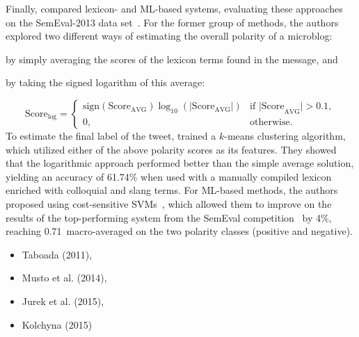 Finally, \citet{Kolchyna:15} compared lexicon- and ML-based systems,
evaluating these approaches on the SemEval-2013 data
set~\cite{Nakov:13}.  For the former group of methods, the authors
explored two different ways of estimating the overall polarity of a
microblog:
\begin{inparaenum}[(i)]
\item by simply averaging the scores of the lexicon terms found in the
  message, and
\item by taking the signed logarithm of this average:
\end{inparaenum}
\begin{equation*}
  \text{Score}_{\log} =
  \begin{cases}
    \text{sign}(\text{Score}_{\text{AVG}})\log_{10}(|\text{Score}_{\text{AVG}}|) & %
    \text{if |Score}_{\text{AVG}}| > 0.1,\\
    0, & \text{otherwise}.
  \end{cases}
\end{equation*}%
To estimate the final label of the tweet, \citeauthor{Kolchyna:15}
trained a $k$-means clustering algorithm, which utilized either of the
above polarity scores as its features.  They showed that the
logarithmic approach performed better than the simple average
solution, yielding an accuracy of 61.74\% when used with a manually
compiled lexicon enriched with colloquial and slang terms.  For
ML-based methods, the authors proposed using cost-sensitive
SVMs~\cite{Masnadi:12}, which allowed them to improve on the results
of the top-performing system from the SemEval
competition~\cite{Mohammad:13} by 4\%, reaching 0.71~macro-averaged
\F{} on the two polarity classes (positive and negative).


\begin{itemize}
\item Taboada (2011),
\item Musto et al. (2014),
\item Jurek et al. (2015),
\item Kolchyna (2015)
\end{itemize}


